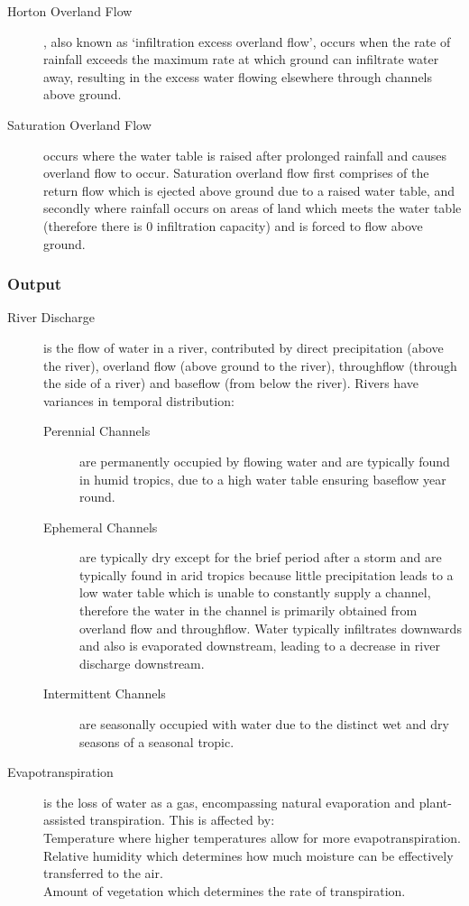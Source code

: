 \documentclass[../../main]{subfiles}
\begin{document}
\begin{description}
		\begin{description}
			\item[Horton Overland Flow], also known as `infiltration excess overland flow', occurs when the rate of rainfall exceeds the maximum rate at which ground can infiltrate water away, resulting in the excess water flowing elsewhere through channels above ground.
			\item[Saturation Overland Flow] occurs where the water table is raised after prolonged rainfall and causes overland flow to occur. Saturation overland flow first comprises of the return flow which is ejected above ground due to a raised water table, and secondly where rainfall occurs on areas of land which meets the water table (therefore there is 0 infiltration capacity) and is forced to flow above ground.
		\end{description}
	\end{description}

\subsubsection{Output}

	\begin{description}
		\item[River Discharge]  is the flow of water in a river, contributed by direct precipitation (above the river), overland flow (above ground to the river), throughflow (through the side of a river) and baseflow (from below the river). Rivers have variances in temporal distribution:
		\begin{description}
			\item[Perennial Channels] are permanently occupied by flowing water and are typically found in humid tropics, due to a high water table ensuring baseflow year round.
			\item[Ephemeral Channels] are typically dry except for the brief period after a storm and are typically found in arid tropics because little precipitation leads to a low water table which is unable to constantly supply a channel, therefore the water in the channel is primarily obtained from overland flow and throughflow. Water typically infiltrates downwards and also is evaporated downstream, leading to a decrease in river discharge downstream.
			\item[Intermittent Channels] are seasonally occupied with water due to the distinct wet and dry seasons of a seasonal tropic.
		\end{description}
		\item[Evapotranspiration] is the loss of water as a gas, encompassing natural evaporation and plant-assisted transpiration. This is affected by: \\
			Temperature where higher temperatures allow for more evapotranspiration. \\
			Relative humidity which determines how much moisture can be effectively transferred to the air. \\
			Amount of vegetation which determines the rate of transpiration.
	\end{description}
\end{document}
